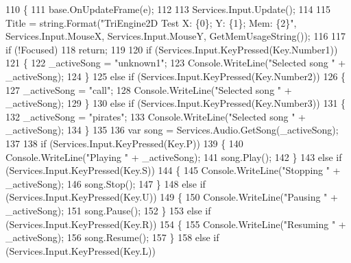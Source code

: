 \begin{DoxyCode}
110         \{
111             base.OnUpdateFrame(e);
112 
113             Services.Input.Update();
114 
115             Title = \textcolor{keywordtype}{string}.Format(\textcolor{stringliteral}{"TriEngine2D Test X: \{0\}; Y: \{1\}; Mem: \{2\}"}, Services.Input.MouseX, 
      Services.Input.MouseY, GetMemUsageString());
116 
117             \textcolor{keywordflow}{if} (!Focused)
118                 \textcolor{keywordflow}{return};
119 
120             \textcolor{keywordflow}{if} (Services.Input.KeyPressed(Key.Number1))
121             \{
122                 \_activeSong = \textcolor{stringliteral}{"unknown1"};
123                 Console.WriteLine(\textcolor{stringliteral}{"Selected song "} + \_activeSong);
124             \}
125             \textcolor{keywordflow}{else} \textcolor{keywordflow}{if} (Services.Input.KeyPressed(Key.Number2))
126             \{
127                 \_activeSong = \textcolor{stringliteral}{"call"};
128                 Console.WriteLine(\textcolor{stringliteral}{"Selected song "} + \_activeSong);
129             \}
130             \textcolor{keywordflow}{else} \textcolor{keywordflow}{if} (Services.Input.KeyPressed(Key.Number3))
131             \{
132                 \_activeSong = \textcolor{stringliteral}{"pirates"};
133                 Console.WriteLine(\textcolor{stringliteral}{"Selected song "} + \_activeSong);
134             \}
135 
136             var song = Services.Audio.GetSong(\_activeSong);
137 
138             \textcolor{keywordflow}{if} (Services.Input.KeyPressed(Key.P))
139             \{
140                 Console.WriteLine(\textcolor{stringliteral}{"Playing "} + \_activeSong);
141                 song.Play();
142             \}
143             \textcolor{keywordflow}{else} \textcolor{keywordflow}{if} (Services.Input.KeyPressed(Key.S))
144             \{
145                 Console.WriteLine(\textcolor{stringliteral}{"Stopping "} + \_activeSong);
146                 song.Stop();
147             \}
148             \textcolor{keywordflow}{else} \textcolor{keywordflow}{if} (Services.Input.KeyPressed(Key.U))
149             \{
150                 Console.WriteLine(\textcolor{stringliteral}{"Pausing "} + \_activeSong);
151                 song.Pause();
152             \}
153             \textcolor{keywordflow}{else} \textcolor{keywordflow}{if} (Services.Input.KeyPressed(Key.R))
154             \{
155                 Console.WriteLine(\textcolor{stringliteral}{"Resuming "} + \_activeSong);
156                 song.Resume();
157             \}
158             \textcolor{keywordflow}{else} \textcolor{keywordflow}{if} (Services.Input.KeyPressed(Key.L))

\end{DoxyCode}
